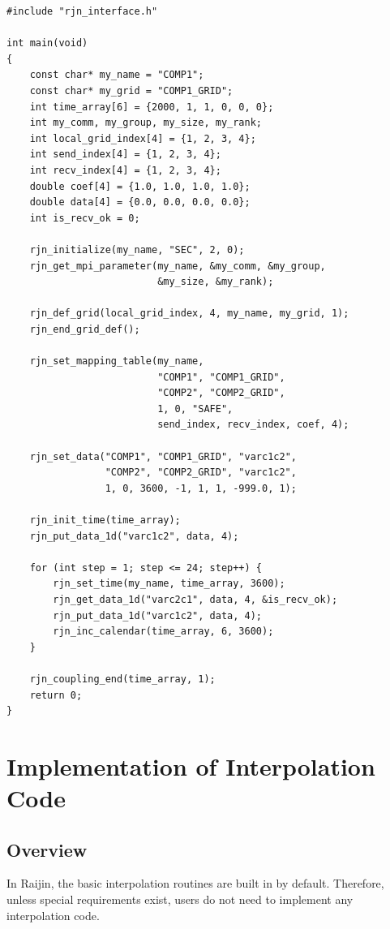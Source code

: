 \documentclass[11pt,a4paper]{report}
\begin{document}
\begin{lstlisting}[caption=Minimal C/C++ coupling sequence, label=list:code_toy]
#include "rjn_interface.h"

int main(void)
{
    const char* my_name = "COMP1";
    const char* my_grid = "COMP1_GRID";
    int time_array[6] = {2000, 1, 1, 0, 0, 0};
    int my_comm, my_group, my_size, my_rank;
    int local_grid_index[4] = {1, 2, 3, 4};
    int send_index[4] = {1, 2, 3, 4};
    int recv_index[4] = {1, 2, 3, 4};
    double coef[4] = {1.0, 1.0, 1.0, 1.0};
    double data[4] = {0.0, 0.0, 0.0, 0.0};
    int is_recv_ok = 0;

    rjn_initialize(my_name, "SEC", 2, 0);
    rjn_get_mpi_parameter(my_name, &my_comm, &my_group,
                          &my_size, &my_rank);

    rjn_def_grid(local_grid_index, 4, my_name, my_grid, 1);
    rjn_end_grid_def();

    rjn_set_mapping_table(my_name,
                          "COMP1", "COMP1_GRID",
                          "COMP2", "COMP2_GRID",
                          1, 0, "SAFE",
                          send_index, recv_index, coef, 4);

    rjn_set_data("COMP1", "COMP1_GRID", "varc1c2",
                 "COMP2", "COMP2_GRID", "varc1c2",
                 1, 0, 3600, -1, 1, 1, -999.0, 1);

    rjn_init_time(time_array);
    rjn_put_data_1d("varc1c2", data, 4);

    for (int step = 1; step <= 24; step++) {
        rjn_set_time(my_name, time_array, 3600);
        rjn_get_data_1d("varc2c1", data, 4, &is_recv_ok);
        rjn_put_data_1d("varc1c2", data, 4);
        rjn_inc_calendar(time_array, 6, 3600);
    }

    rjn_coupling_end(time_array, 1);
    return 0;
}
\end{lstlisting}



\chapter{Implementation of Interpolation Code}

\section{Overview}
In Raijin, the basic interpolation routines
are built in by default.
Therefore, unless special requirements exist,
users do not need to implement any interpolation code.
\end{document}
